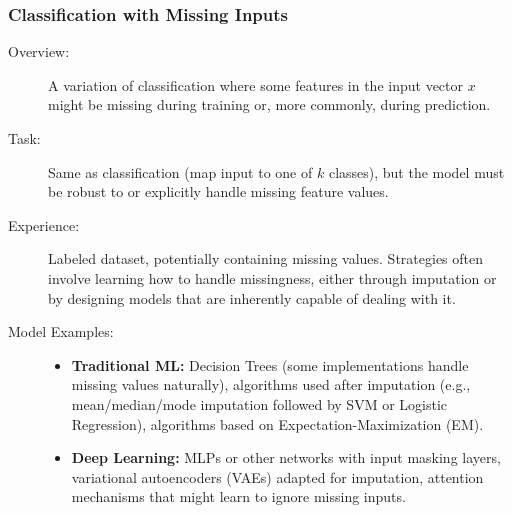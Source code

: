 \documentclass{article}
\begin{document}
\subsubsection{Classification with Missing Inputs}
\begin{description}
    \item[Overview:] A variation of classification where some features in the input vector $x$ might be missing during training or, more commonly, during prediction.
    \item[Task:] Same as classification (map input to one of $k$ classes), but the model must be robust to or explicitly handle missing feature values.
    \item[Experience:] Labeled dataset, potentially containing missing values. Strategies often involve learning how to handle missingness, either through imputation or by designing models that are inherently capable of dealing with it.
    \item[Model Examples:]
        \begin{itemize}
            \item \textbf{Traditional ML:} Decision Trees (some implementations handle missing values naturally), algorithms used after imputation (e.g., mean/median/mode imputation followed by SVM or Logistic Regression), algorithms based on Expectation-Maximization (EM).
            \item \textbf{Deep Learning:} MLPs or other networks with input masking layers, variational autoencoders (VAEs) adapted for imputation, attention mechanisms that might learn to ignore missing inputs.
        \end{itemize}
\end{description}
\end{document}
